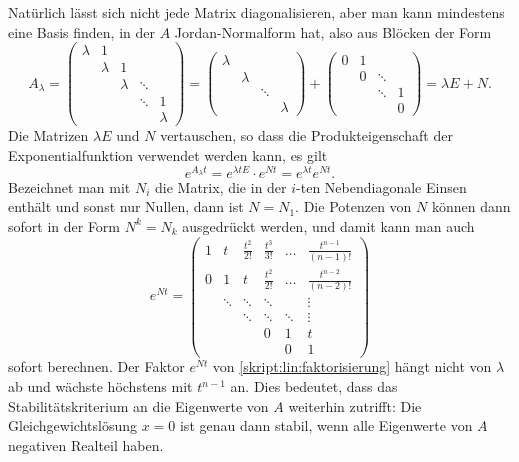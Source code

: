 Natürlich lässt sich nicht jede Matrix diagonalisieren, aber man kann
mindestens eine Basis finden, in der $A$ Jordan-Normalform hat, also aus
%
Blöcken der Form
\[
A_{\lambda}
=
\begin{pmatrix}
\lambda&   1   &       &       &       \\
       &\lambda&   1   &       &       \\
       &       &\lambda&\ddots &       \\
       &       &       &\ddots &    1  \\
       &       &       &       &\lambda
\end{pmatrix}
=
\begin{pmatrix}
\lambda&       &       &       \\
       &\lambda&       &       \\
       &       &\ddots &       \\
       &       &       &\lambda
\end{pmatrix}
+
\begin{pmatrix}
   0   &   1   &       &       \\
       &   0   &\ddots &       \\
       &       &\ddots &   1   \\
       &       &       &   0
\end{pmatrix}
=
\lambda E + N.
\]
Die Matrizen $\lambda E$ und $N$ vertauschen, so dass die
Produkteigenschaft der Exponentialfunktion verwendet werden kann,
es gilt
\begin{equation}
e^{A_\lambda t}
=
e^{\lambda tE}\cdot e^{Nt}
=
e^{\lambda t} e^{Nt}.
\label{skript:lin:faktorisierung}
\end{equation}
Bezeichnet man mit $N_i$ die Matrix, die in der $i$-ten Nebendiagonale
Einsen enthält und sonst nur Nullen, dann ist $N=N_1$.
Die Potenzen von $N$ können dann sofort in der Form $N^k=N_k$ ausgedrückt
werden, und damit kann man auch
\begin{equation}
e^{Nt}
=
\begin{pmatrix}
1&t&\frac{t^2}{2!}&\frac{t^3}{3!}& \dots & \frac{t^{n-1}}{(n-1)!}\\
0&1&       t      &\frac{t^2}{2!}& \dots & \frac{t^{n-2}}{(n-2)!}\\
      &\ddots&\ddots& \ddots     &       & \vdots                \\
      &      &\ddots& \ddots     &\ddots & \vdots                \\
      &      &      &         0  &    1  & t \\
      &      &      &            &    0  & 1
\end{pmatrix}
\end{equation}
sofort berechnen.
Der Faktor $e^{Nt}$ von \eqref{skript:lin:faktorisierung}
hängt nicht von $\lambda$ ab und wächste höchstens mit $t^{n-1}$ an.
Dies bedeutet, dass das Stabilitätskriterium an die Eigenwerte von $A$
weiterhin zutrifft: Die Gleichgewichtslösung $x=0$ ist genau dann stabil,
wenn alle Eigenwerte von $A$ negativen Realteil haben.

